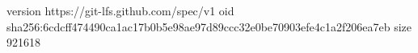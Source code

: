 version https://git-lfs.github.com/spec/v1
oid sha256:6cdcff474490ca1ac17b0b5e98ae97d89ccc32e0be70903efe4c1a2f206ea7eb
size 921618

